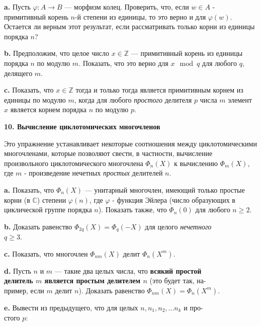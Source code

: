 \documentclass{mai_book}
\begin{document}

\bigskip

{\bf a.} Пусть $\varphi : A \rightarrow B$ — морфизм колец. Проверить, что, если $w \in A$ - примитивный корень $n$-й степени из единицы, то это верно и для $\varphi(w)$. Остается ли верным этот результат, если рассматривать только корни из единицы порядка $n$?

\smallskip

{\bf b.} Предположим, что целое число $x \in \mathbb Z$ — примитивный корень из
единицы порядка $n$ по модулю $m$. Показать, что это верно для $x \mod q$ для любого $q$, делящего $m$.

\smallskip

{\bf c.} Показать, что $x \in \mathbb Z$ тогда и только тогда является примитивным
корнем из единицы по модулю $m$, когда для любого \textit{простого} делителя $p$ числа $m$ элемент $x$ является корнем порядка $n$ по модулю $p$.

\bigskip

{\bf 10. Вычисление циклотомических многочленов}

\medskip

Это упражнение устанавливает некоторые соотношения между циклотомическими многочленами, которые позволяют свести, в частности, вычисление произвольного циклотомического многочлена $\Phi_n(X)$ к вычислению $\Phi_m(X)$, где $m$ - произведение нечетных \textit{простых} делителей $n$.

{\bf a.} Показать, что $\Phi_n(X)$ — унитарный многочлен, имеющий только
простые корни (в $\mathbb C$) степени $\varphi(n)$, где $\varphi$ - функция Эйлера (число образующих в циклической группе порядка $n$). Показать также, что
$\Phi_n(0)$ для любого $n \geq 2$.

{\bf b.} Доказать равенство $\Phi_{2q}(X) = \Phi_{q}(-X)$ для целого \textit{нечетного} \\ $q \geq 3$.

{\bf c.} Показать, что
многочлен $\Phi_{nm}(X)$ делит $\Phi_n(X^m)$.

{\bf d.} Пусть $n$ и $m$ — такие два целых числа, что {\bf всякий простой \\
 делитель $m$ является простым делителем $n$} (это будет так, на- \\
пример, если $m$ делит $n$). Доказать равенство $\Phi_{nm}(X) = \Phi_n(X^m)$.

{\bf e.} Вывести из предыдущего, что для целых $n, n_1, n_2, \ldots n_k$ и про- \\ 
стого $p$:
\end{document}
